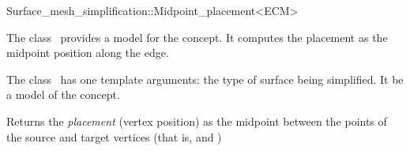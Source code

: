 

\begin{ccRefClass}{Surface_mesh_simplification::Midpoint_placement<ECM>}


\ccDefinition

The class \ccRefName\ provides a model for the  concept. 
It computes the placement as the midpoint position along the edge.

The class \ccRefName\ has one template arguments: the type of surface being simplified. 
It be a model of the  concept.


\ccIsModel
{}

\ccCreation
{}  %

  {Returns the {\em placement} (vertex position) as the midpoint between 
  the points of the source and target vertices
  (that is,  and )}

\end{ccRefClass}


